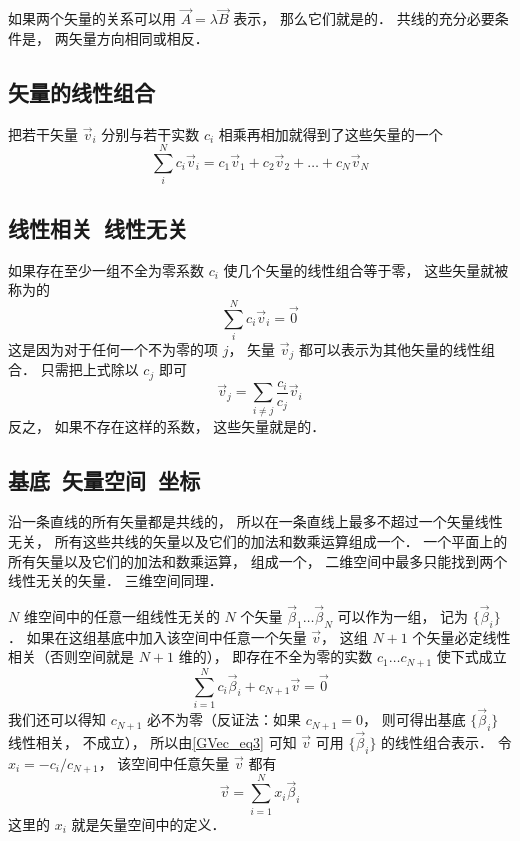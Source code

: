 如果两个矢量的关系可以用 $\vec A = \lambda\vec B$ 表示， 那么它们就是的． 共线的充分必要条件是， 两矢量方向相同或相反．

\subsection{矢量的线性组合}
把若干矢量 $\vec v_i$ 分别与若干实数 $c_i$ 相乘再相加就得到了这些矢量的一个
\begin{equation}
\sum_i^N c_i \vec v_i = c_1\vec v_1 + c_2\vec v_2 +\dots +c_N \vec v_N
\end{equation}

\subsection{线性相关\ 线性无关}
如果存在至少一组不全为零系数 $c_i$ 使几个矢量的线性组合等于零， 这些矢量就被称为的
\begin{equation}
\sum_i^N c_i \vec v_i = \vec 0
\end{equation}
这是因为对于任何一个不为零的项 $j$， 矢量 $\vec v_j$ 都可以表示为其他矢量的线性组合． 只需把上式除以 $c_j$ 即可
\begin{equation}\label{GVec_eq3}
\vec v_j = \sum_{i \ne j}\frac{c_i}{c_j} \vec v_i
\end{equation}
反之， 如果不存在这样的系数， 这些矢量就是的． 

\subsection{基底\ 矢量空间\ 坐标}
沿一条直线的所有矢量都是共线的， 所以在一条直线上最多不超过一个矢量线性无关， 所有这些共线的矢量以及它们的加法和数乘运算组成一个． 一个平面上的所有矢量以及它们的加法和数乘运算， 组成一个， 二维空间中最多只能找到两个线性无关的矢量． 三维空间同理． 

$N$ 维空间中的任意一组线性无关的 $N$ 个矢量 $\vec \beta_1\dots \vec \beta_N$ 可以作为一组， 记为 $\{\vec \beta_i\}$． 如果在这组基底中加入该空间中任意一个矢量 $\vec v$， 这组 $N+1$ 个矢量必定线性相关（否则空间就是 $N+1$ 维的）， 即存在不全为零的实数 $c_1\dots c_{N+1}$ 使下式成立
\begin{equation}
\sum_{i=1}^N c_i \vec \beta_i + c_{N+1} \vec v = \vec 0
\end{equation}
我们还可以得知 $c_{N+1}$ 必不为零（反证法：如果 $c_{N+1} = 0$， 则可得出基底 $\{\vec \beta_i\}$ 线性相关， 不成立）， 所以由\autoref{GVec_eq3} 可知 $\vec v$ 可用 $\{\vec \beta_i\}$ 的线性组合表示． 令 $x_i = -c_i/c_{N+1}$， 该空间中任意矢量 $\vec v$ 都有
\begin{equation}\label{GVec_eq5}
\vec v = \sum_{i=1}^N x_i \vec \beta_i
\end{equation}
这里的 $x_i$ 就是矢量空间中的定义．

